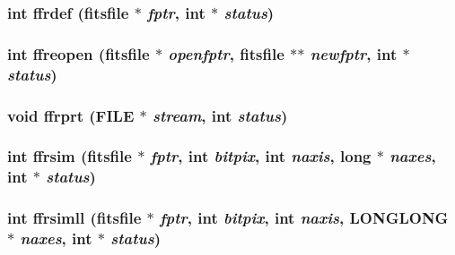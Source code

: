 \subsubsection{\setlength{\rightskip}{0pt plus 5cm}int ffrdef (\bf{fitsfile} $\ast$ {\em fptr}, int $\ast$ {\em status})}\label{fitsio__64_8h_4b27e85305907801c1c6161bee2bd45e}


\subsubsection{\setlength{\rightskip}{0pt plus 5cm}int ffreopen (\bf{fitsfile} $\ast$ {\em openfptr}, \bf{fitsfile} $\ast$$\ast$ {\em newfptr}, int $\ast$ {\em status})}\label{fitsio__64_8h_0f52024e2521bf029d2bf87a365e9e39}


\subsubsection{\setlength{\rightskip}{0pt plus 5cm}void ffrprt (FILE $\ast$ {\em stream}, int {\em status})}\label{fitsio__64_8h_ddc25a8219909329a0d3aed010d854ee}


\subsubsection{\setlength{\rightskip}{0pt plus 5cm}int ffrsim (\bf{fitsfile} $\ast$ {\em fptr}, int {\em bitpix}, int {\em naxis}, long $\ast$ {\em naxes}, int $\ast$ {\em status})}\label{fitsio__64_8h_41eea6b73ae062d053678b27edcdb3ce}


\subsubsection{\setlength{\rightskip}{0pt plus 5cm}int ffrsimll (\bf{fitsfile} $\ast$ {\em fptr}, int {\em bitpix}, int {\em naxis}, \bf{LONGLONG} $\ast$ {\em naxes}, int $\ast$ {\em status})}\label{fitsio__64_8h_de7508b8896dfcdd7e4d35164688ef92}


